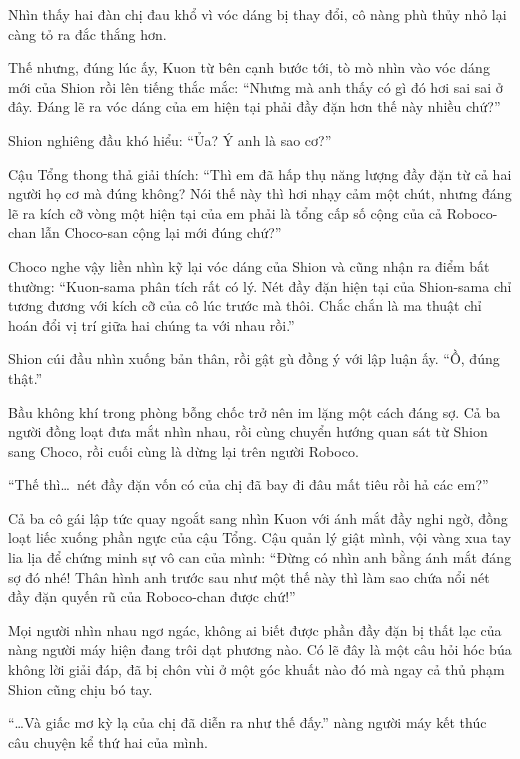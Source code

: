\documentclass[../main.tex]{subfiles}
\begin{document}
Nhìn thấy hai đàn chị đau khổ vì vóc dáng bị thay đổi, cô nàng phù thủy nhỏ lại càng tỏ ra đắc thắng hơn.

Thế nhưng, đúng lúc ấy, Kuon từ bên cạnh bước tới, tò mò nhìn vào vóc dáng mới của Shion rồi lên tiếng thắc mắc:
``Nhưng mà anh thấy có gì đó hơi sai sai ở đây. Đáng lẽ ra vóc dáng của em hiện tại phải đầy đặn hơn thế này nhiều chứ?''

Shion nghiêng đầu khó hiểu:
``Ủa? Ý anh là sao cơ?''

Cậu Tổng thong thả giải thích:
``Thì em đã hấp thụ năng lượng đầy đặn từ cả hai người họ cơ mà đúng không? Nói thế này thì hơi nhạy cảm một chút, nhưng đáng lẽ ra kích cỡ vòng một hiện tại của em phải là tổng cấp số cộng của cả Roboco-chan lẫn Choco-san cộng lại mới đúng chứ?''

Choco nghe vậy liền nhìn kỹ lại vóc dáng của Shion và cũng nhận ra điểm bất thường:
``Kuon-sama phân tích rất có lý. Nét đầy đặn hiện tại của Shion-sama chỉ tương đương với kích cỡ của cô lúc trước mà thôi. Chắc chắn là ma thuật chỉ hoán đổi vị trí giữa hai chúng ta với nhau rồi.''

Shion cúi đầu nhìn xuống bản thân, rồi gật gù đồng ý với lập luận ấy. ``Ồ, đúng thật.''

Bầu không khí trong phòng bỗng chốc trở nên im lặng một cách đáng sợ. Cả ba người đồng loạt đưa mắt nhìn nhau, rồi cùng chuyển hướng quan sát từ Shion sang Choco, rồi cuối cùng là dừng lại trên người Roboco.

``Thế thì\dots\ nét đầy đặn vốn có của chị đã bay đi đâu mất tiêu rồi hả các em?''


Cả ba cô gái lập tức quay ngoắt sang nhìn Kuon với ánh mắt đầy nghi ngờ, đồng loạt liếc xuống phần ngực của cậu Tổng. Cậu quản lý giật mình, vội vàng xua tay lia lịa để chứng minh sự vô can của mình:
``Đừng có nhìn anh bằng ánh mắt đáng sợ đó nhé! Thân hình anh trước sau như một thế này thì làm sao chứa nổi nét đầy đặn quyến rũ của Roboco-chan được chứ!''

Mọi người nhìn nhau ngơ ngác, không ai biết được phần đầy đặn bị thất lạc của nàng người máy hiện đang trôi dạt phương nào. Có lẽ đây là một câu hỏi hóc búa không lời giải đáp, đã bị chôn vùi ở một góc khuất nào đó mà ngay cả thủ phạm Shion cũng chịu bó tay.

\il

``\dots Và giấc mơ kỳ lạ của chị đã diễn ra như thế đấy.'' nàng người máy kết thúc câu chuyện kể thứ hai của mình.
\end{document}
